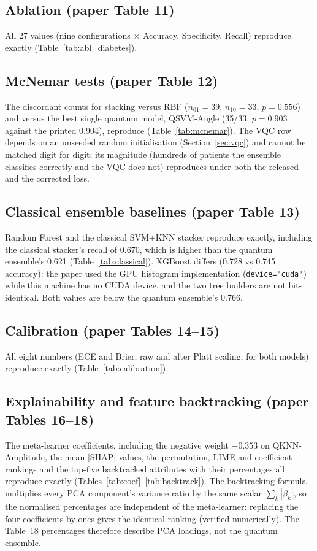 \documentclass[11pt,a4paper]{article}
\newcommand{\code}[1]{\texttt{\small #1}}
\newcommand{\tabdir}{../reimplementation/tex/}
\begin{document}
\subsection{Ablation (paper Table 11)}
All 27 values (nine configurations $\times$ Accuracy, Specificity, Recall) reproduce exactly (Table~\ref{tab:abl_diabetes}).


\subsection{McNemar tests (paper Table 12)}
The discordant counts for stacking versus RBF ($n_{01}=39$, $n_{10}=33$, $p=0.556$) and versus the best single quantum model, QSVM-Angle (35/33, $p=0.903$ against the printed 0.904), reproduce (Table~\ref{tab:mcnemar}). The VQC row depends on an unseeded random initialisation (Section~\ref{sec:vqc}) and cannot be matched digit for digit; its magnitude (hundreds of patients the ensemble classifies correctly and the VQC does not) reproduces under both the released and the corrected loss.


\subsection{Classical ensemble baselines (paper Table 13)}
Random Forest and the classical SVM+KNN stacker reproduce exactly, including the classical stacker's recall of 0.670, which is higher than the quantum ensemble's 0.621 (Table~\ref{tab:classical}). XGBoost differs (0.728 vs 0.745 accuracy): the paper used the GPU histogram implementation (\code{device="cuda"}) while this machine has no CUDA device, and the two tree builders are not bit-identical. Both values are below the quantum ensemble's 0.766.


\subsection{Calibration (paper Tables 14--15)}
All eight numbers (ECE and Brier, raw and after Platt scaling, for both models) reproduce exactly (Table~\ref{tab:calibration}).


\subsection{Explainability and feature backtracking (paper Tables 16--18)}
The meta-learner coefficients, including the negative weight $-0.353$ on QKNN-Amplitude, the mean $|$SHAP$|$ values, the permutation, LIME and coefficient rankings and the top-five backtracked attributes with their percentages all reproduce exactly (Tables~\ref{tab:coef}--\ref{tab:backtrack}). The backtracking formula multiplies every PCA component's variance ratio by the same scalar $\sum_k|\beta_k|$, so the normalised percentages are independent of the meta-learner: replacing the four coefficients by ones gives the identical ranking (verified numerically). The Table~18 percentages therefore describe PCA loadings, not the quantum ensemble.



\end{document}
